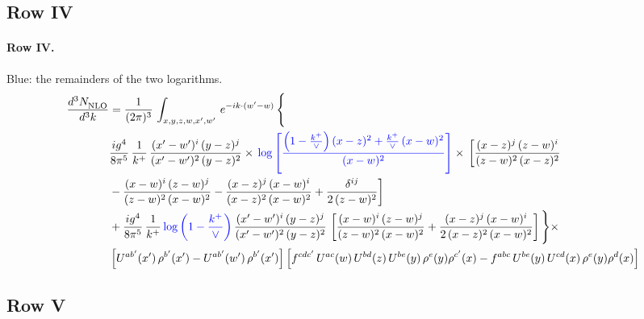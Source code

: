 \documentclass[10pt]{article}
\numberwithin{equation}{section}
\newcommand{\new}[1]{{\color{blue}#1}}
\begin{document}
\subsection{Row IV}
\paragraph{Row IV.}
\new{Blue}: the remainders of the two logarithms.
\begin{align}
    \frac{d^{3}N_{\rm NLO}^{\rm}}{d^{3}k}  & =   \frac{1}{(2\pi)^{3}}\,
    \int_{x,y,z,w,x',w'}\,e^{-ik\cdot (w^\prime-w)}\,\Bigg\{\notag \\
& \frac{ig^{4}}{8\pi^{5}}\,\frac{1}{k^{+}}\,\frac{(x'-w')^{i}\,(y-z)^{j}}{(x'-w')^{2}\,(y-z)^{2}}\times\,\new{\log{\left[\frac{\left(1-\frac{k^{+}}{\vee}\right)(x-z)^{2}+\frac{k^{+}}{\vee}\,(x-w)^{2}}{(x-w)^{2}}\right]}}\times\, \bigg[\frac{(x-z)^{j}\,(z-w)^{i}}{(z-w)^{2}\,(x-z)^{2}}\notag \\ & -\frac{(x-w)^{i}\,(z-w)^{j}}{(z-w)^{2}\,(x-w)^{2}}-\frac{(x-z)^{j}\,(x-w)^{i}}{(x-z)^{2}\,(x-w)^{2}}+\frac{\delta^{ij}}{2\,(z-w)^{2}}\bigg] \notag \\
& + \frac{ig^{4}}{8\pi^{5}}\,\frac{1}{k^{+}}\,\new{\log{\left(1-\frac{k^{+}}{\vee}\right)}}\,\frac{(x'-w')^{i}\,(y-z)^{j}}{(x'-w')^{2}\,(y-z)^{2}}\,\left[\frac{(x-w)^{i}\,(z-w)^{j}}{(z-w)^{2}\,(x-w)^{2}}+\frac{(x-z)^{j}\,(x-w)^{i}}{2\, (x-z)^{2}\,(x-w)^{2}}\right]\Bigg\}\times\notag \\ &  \left[U^{ab'}(x')\,\rho^{b'}(x')-U^{ab'}(w')\,\rho^{b'}(x')\right] \left[f^{cdc'}\,U^{ac}(w)\,U^{bd}(z)\,U^{be}(y)\,\rho^{e}(y)\rho^{c'}(x)-f^{abc}\,U^{be}(y)\,U^{cd}(x)\,\rho^{e}(y)\rho^{d}(x)\right] \label{eq:F:G1IV}
\end{align}

\subsection{Row V}
\end{document}
